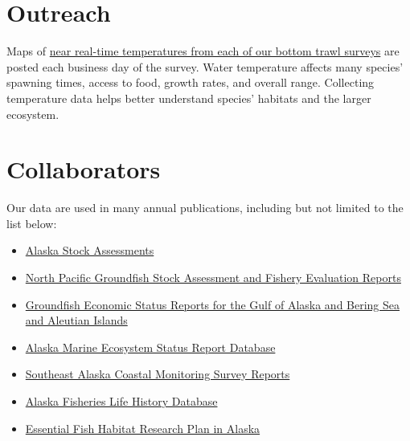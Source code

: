 \documentclass[
  letterpaper,
  oneside,
  open=any]{scrbook}
\providecommand{\tightlist}{%
  \setlength{\itemsep}{0pt}\setlength{\parskip}{0pt}}\usepackage{longtable,booktabs,array}
\begin{document}
\hypertarget{outreach}{%
\section*{Outreach}\label{outreach}}


Maps of
\href{https://www.fisheries.noaa.gov/alaska/science-data/bottom-trawl-survey-temperature-maps}{near
real-time temperatures from each of our bottom trawl surveys} are posted
each business day of the survey. Water temperature affects many species'
spawning times, access to food, growth rates, and overall range.
Collecting temperature data helps better understand species' habitats
and the larger ecosystem.

\hypertarget{collaborators}{%
\section*{Collaborators}\label{collaborators}}


Our data are used in many annual publications, including but not limited
to the list below:

\begin{itemize}
\tightlist
\item
  \href{https://www.fisheries.noaa.gov/alaska/population-assessments/alaska-stock-assessments}{Alaska
  Stock Assessments}
\item
  \href{https://www.fisheries.noaa.gov/alaska/population-assessments/north-pacific-groundfish-stock-assessment-and-fishery-evaluation}{North
  Pacific Groundfish Stock Assessment and Fishery Evaluation Reports}
\item
  \href{https://www.fisheries.noaa.gov/alaska/commercial-fishing/groundfish-economic-status-reports-gulf-alaska-and-bering-sea-and-aleutian-islands}{Groundfish
  Economic Status Reports for the Gulf of Alaska and Bering Sea and
  Aleutian Islands}
\item
  \href{https://www.fisheries.noaa.gov/resource/data/alaska-marine-ecosystem-status-report-archive}{Alaska
  Marine Ecosystem Status Report Database}
\item
  \href{https://www.fisheries.noaa.gov/alaska/commercial-fishing/southeast-alaska-coastal-monitoring-survey-reports}{Southeast
  Alaska Coastal Monitoring Survey Reports}
\item
  \href{https://www.fisheries.noaa.gov/resource/data/alaska-fisheries-life-history-database}{Alaska
  Fisheries Life History Database}
\item
  \href{https://www.fisheries.noaa.gov/alaska/habitat-conservation/essential-fish-habitat-research-plan-alaska}{Essential
  Fish Habitat Research Plan in Alaska}
\end{itemize}
\end{document}
